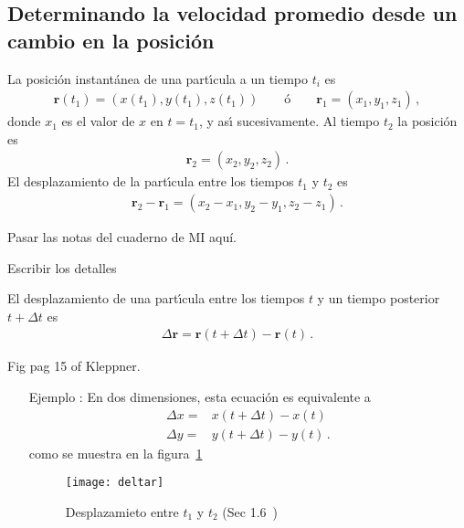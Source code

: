 \subsection{Determinando la velocidad promedio desde un cambio en la posición}
La posici\'on instant\'anea de una part\'\i cula a un tiempo $t_i$ es
\begin{align}
  \mathbf{r}(t_1)=(x(t_1),y(t_1),z(t_1))\qquad \text{\'o}\qquad
  \mathbf{r}_1=(x_1,y_1,z_1)\,,
\end{align}
donde $x_1$ es el valor de $x$ en $t=t_1$, y as\'\i{} sucesivamente. Al tiempo $t_2$ la posici\'on es
\begin{align}
  \mathbf{r}_2=(x_2,y_2,z_2)\,.
\end{align}
El desplazamiento de la part\'\i cula entre los tiempos $t_1$ y $t_2$ es
\begin{align}
  \mathbf{r}_2-\mathbf{r}_1=(x_2-x_1,y_2-y_1,z_2-z_1)\,.
\end{align}



\begin{inprogress}
Pasar las notas del cuaderno de MI aquí.

Escribir los detalles %
\end{inprogress}
El desplazamiento de una part\'\i cula entre los tiempos $t$ y un tiempo posterior $t+\Delta t$ es
\begin{align}
  \Delta\mathbf{r}=\mathbf{r}(t+\Delta t)-\mathbf{r}(t)\,.
\end{align}


\begin{inprogress}
  Fig pag 15 of Kleppner.
\end{inprogress}

\begin{itemize}
\item[Ejemplo]: En dos dimensiones, esta ecuaci\'on es equivalente a
  \begin{align}
    \Delta x=&x(t+\Delta t)-x(t)\nonumber\\
    \Delta y=&y(t+\Delta t)-y(t)\,.
  \end{align}
  como se muestra en la figura~\ref{fig:deltar}
  \begin{figure}
    \centering
    \texttt{[image: deltar]}
    \caption{Desplazamieto entre $t_1$ y $t_2$ (Sec 1.6~\cite{Kleppner})}
    \label{fig:deltar}
  \end{figure}

\end{itemize}


